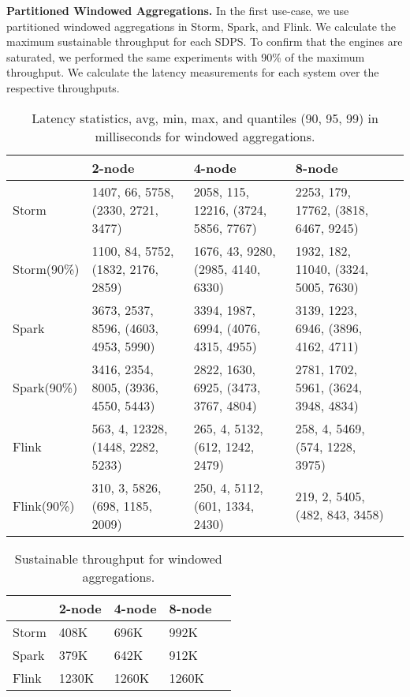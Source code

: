 \textbf{Partitioned Windowed Aggregations.}
In the first use-case, we use parti\-tioned  windowed aggregations in Storm, Spark, and Flink. We calculate the maximum sustainable  throughput for  each SDPS. To confirm that the engines are saturated, we performed the same experiments with 90\% of the maximum throughput. We calculate the latency measurements for each system over the respective throughputs.  

    \begin{table*}
        \resizebox{\textwidth}{!} {\begin{tabular}{lllll}\toprule
            &\textbf{2-node}  & \textbf{4-node} & \textbf{8-node}\\\midrule
            Storm & 1407, 66, 5758, (2330, 2721, 3477) & 2058, 115, 12216, (3724, 5856, 7767) & 2253, 179, 17762, (3818, 6467, 9245) \\
            Storm(90\%) & 1100, 84, 5752, (1832, 2176, 2859) & 1676, 43, 9280, (2985, 4140, 6330) & 1932, 182, 11040, (3324, 5005, 7630) \\
            Spark & 3673, 2537, 8596, (4603, 4953, 5990) & 3394, 1987, 6994, (4076, 4315, 4955) & 3139, 1223, 6946, (3896, 4162, 4711)\\
            Spark(90\%) & 3416, 2354, 8005, (3936, 4550, 5443) & 2822, 1630, 6925, (3473, 3767, 4804) & 2781, 1702, 5961, (3624, 3948, 4834)\\
            Flink & 563, 4, 12328, (1448, 2282, 5233) & 265, 4, 5132, (612, 1242, 2479) & 258, 4, 5469, (574, 1228, 3975) \\
            Flink(90\%) & 310, 3, 5826, (698, 1185, 2009) & 250, 4, 5112, (601, 1334, 2430)  & 219, 2, 5405, (482, 843, 3458) \\
        \end{tabular}}
        \caption{ Latency statistics, avg, min, max, and quantiles (90, 95, 99) in milliseconds for windowed aggregations. }
         \label{tab_lat_agg}
    \end{table*} 



    \begin{table}
        \begin{tabular}{lllll}\toprule
            &\textbf{2-node}  & \textbf{4-node} & \textbf{8-node}\\\midrule
            Storm & 408K & 696K & 992K  \\
            Spark & 379K & 642K & 912K  \\
            Flink & 1230K & 1260K & 1260K  \\
        \end{tabular}
        \caption{Sustainable throughput for windowed aggregations. }
        \label{tab_th_agg}
    \end{table} 


